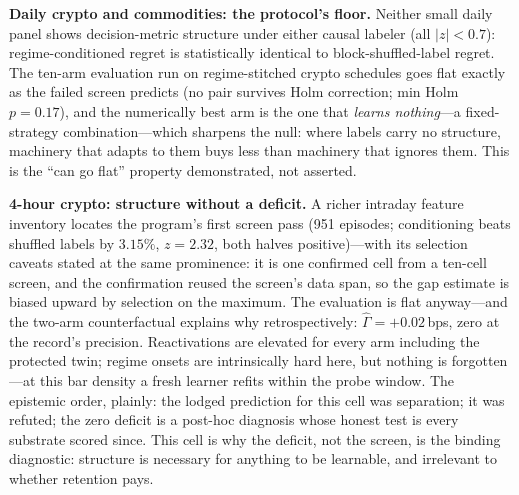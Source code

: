 \documentclass[sigconf,anonymous]{acmart}
\newcommand{\G}{\hat\Gamma}
\begin{document}
\textbf{Daily crypto and commodities: the protocol's floor.} Neither
small daily panel shows decision-metric structure under either causal
labeler (all $|z| < 0.7$): regime-conditioned regret is statistically
identical to block-shuffled-label regret. The ten-arm evaluation run on
regime-stitched crypto schedules goes flat exactly as the failed screen
predicts (no pair survives Holm correction; min Holm $p = 0.17$), and
the numerically best arm is the one that \emph{learns nothing}---a
fixed-strategy combination---which sharpens the null: where labels carry
no structure, machinery that adapts to them buys less than machinery
that ignores them. This is the ``can go flat'' property demonstrated,
not asserted.

\textbf{4-hour crypto: structure without a deficit.} A richer intraday
feature inventory locates the program's first screen pass (951 episodes;
conditioning beats shuffled labels by $3.15\%$, $z = 2.32$, both halves
positive)---with its selection caveats stated at the same prominence:
it is one confirmed cell from a ten-cell screen, and the confirmation
reused the screen's data span, so the gap estimate is biased upward by
selection on the maximum. The evaluation is flat anyway---and the
two-arm counterfactual explains why retrospectively: $\G = +0.02$\,bps,
zero at the record's precision. Reactivations are elevated for every arm
including the protected twin; regime onsets are intrinsically hard
here, but nothing is forgotten---at this bar density a fresh learner
refits within the probe window. The epistemic order, plainly: the
lodged prediction for this cell was separation; it was refuted; the
zero deficit is a post-hoc diagnosis whose honest test is every
substrate scored since. This cell is why the deficit, not the screen, is the binding
diagnostic: structure is necessary for anything to be learnable, and
irrelevant to whether retention pays.
\end{document}
